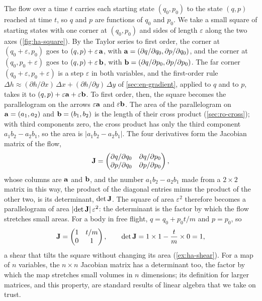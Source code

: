\begin{toolbox}
The flow over a time $t$ carries each starting state $(q_0, p_0)$ to the
state $(q, p)$ reached at time $t$, so $q$ and $p$ are functions of $q_0$
and $p_0$. We take a small square of starting states with one corner at
$(q_0, p_0)$ and sides of length $\varepsilon$ along the two axes
(\cref{fig:ha-square}). By the Taylor series to first order, the corner
at $(q_0 + \varepsilon, p_0)$ goes to $(q, p) + \varepsilon\,\bm{\mathrm{a}}$, with
$\bm{\mathrm{a}} = (\partial q/\partial q_0, \partial p/\partial q_0)$, and the
corner at $(q_0, p_0 + \varepsilon)$ goes to $(q, p) + \varepsilon\,
\bm{\mathrm{b}}$, with $\bm{\mathrm{b}} = (\partial q/\partial p_0, \partial p/\partial
p_0)$. The far corner $(q_0 + \varepsilon, p_0 +
\varepsilon)$ is a step $\varepsilon$ in both variables, and the
first-order rule $\Delta h \approx (\partial h/\partial x)\,\Delta x +
(\partial h/\partial y)\,\Delta y$ of \cref{sec:en-gradient}, applied to
$q$ and to $p$, takes it to $(q, p) + \varepsilon\bm{\mathrm{a}} + \varepsilon
\bm{\mathrm{b}}$. To first order, then, the square becomes the parallelogram on the
arrows $\varepsilon\bm{\mathrm{a}}$ and $\varepsilon\bm{\mathrm{b}}$. The area of the
parallelogram on $\bm{\mathrm{a}} = (a_1, a_2)$ and $\bm{\mathrm{b}} = (b_1, b_2)$ is the
length of their cross product (\cref{sec:ro-cross}); with third
components zero, the cross product has only the third component $a_1b_2 -
a_2b_1$, so the area is $\lvert a_1b_2 - a_2b_1\rvert$. The four
derivatives form the Jacobian matrix of the flow,
\begin{equation*}
   \bm{\mathrm{J}} = \begin{pmatrix}
      \partial q/\partial q_0 & \partial q/\partial p_0\\
      \partial p/\partial q_0 & \partial p/\partial p_0
   \end{pmatrix} ,
\end{equation*}
whose columns are $\bm{\mathrm{a}}$ and $\bm{\mathrm{b}}$, and the number $a_1b_2 - a_2b_1$
made from a $2\times2$ matrix in this way, the product of the diagonal
entries minus the product of the other two, is its determinant, $\det
\bm{\mathrm{J}}$. The square of area $\varepsilon^2$ therefore becomes a
parallelogram of area $\lvert\det\bm{\mathrm{J}}\rvert\,\varepsilon^2$: the
determinant is the factor by which the flow stretches small areas. For a
body in free flight, $q = q_0 + p_0t/m$ and $p = p_0$, so
\begin{equation*}
   \bm{\mathrm{J}} = \begin{pmatrix} 1 & t/m\\ 0 & 1 \end{pmatrix} ,
   \qquad \det\bm{\mathrm{J}} = 1\times1 - \frac{t}{m}\times0 = 1 ,
\end{equation*}
a shear that tilts the square without changing its area
(\cref{ex:ha-shear}). For a map of $n$ variables, the $n\times n$
Jacobian matrix has a determinant too, the factor by which the map
stretches small volumes in $n$ dimensions; its definition for larger
matrices, and this property, are standard results of linear algebra that
we take on trust.
\end{toolbox}


